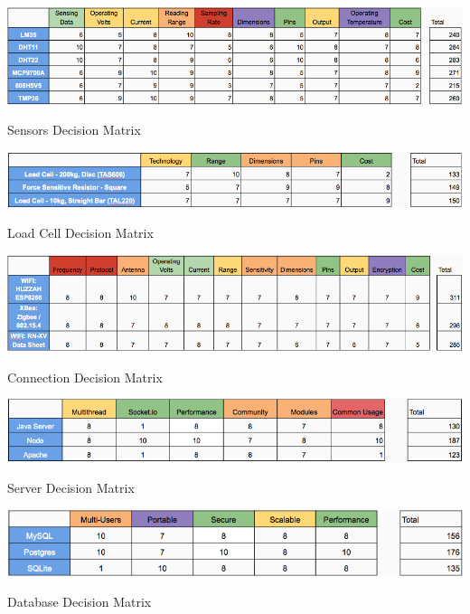 \documentclass[12pt]{article}
\begin{document}
\begin{appendix}
  \begin{table}[!htb]
    \includegraphics[width=\textwidth]{Figures/DecisionMatrixSensors}
    \caption{Sensors Decision Matrix}
     \label{tabl:DecSensors}
  \end{table}

  \begin{table}[!htb]
    \includegraphics[width=\textwidth]{Figures/DecisionMatrixLoadCell}
    \caption{Load Cell Decision Matrix}
     \label{tabl:DecLoadCell}
  \end{table}

  \begin{table}[!htb]
    \includegraphics[width=\textwidth]{Figures/DecisionMatrixConnection}
    \caption{Connection Decision Matrix}
     \label{tabl:DecConnection}
  \end{table}

  \begin{table}[!htb]
    \includegraphics[width=\textwidth]{Figures/DecisionMatrixServer}
    \caption{Server Decision Matrix}
     \label{tabl:DecServer}
  \end{table}

  \begin{table}[!htb]
    \includegraphics[width=\textwidth]{Figures/DecisionMatrixDatabase}
    \caption{Database Decision Matrix}
     \label{tabl:DecDatabase}
  \end{table}


\end{appendix}
\end{document}
